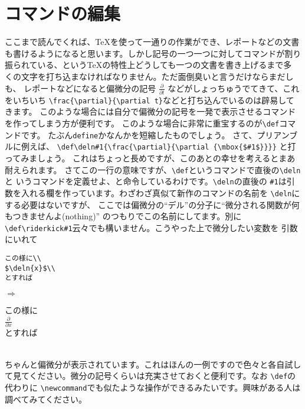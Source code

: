 
\section{コマンドの編集}
ここまで読んでくれば、{\TeX}を使って一通りの作業ができ、レポートなどの文書
も書けるようになると思います。しかし記号の一つ一つに対してコマンドが割り
振られている、という{\TeX}の特性上どうしても一つの文書を書き上げるまで多
くの文字を打ち込まなければなりません。ただ面倒臭いと言うだけならまだしも、
レポートなどになると偏微分の記号
$\displaystyle \frac{\partial}{\partial t}$
などがしょっちゅうでてきて、これをいちいち
\verb+\frac{\partial}{\partial t}+などと打ち込んでいるのは辟易してきます。
このような場合には自分で偏微分の記号を一発で表示させるコマンドを作ってしまう方が便利です。
このような場合に非常に重宝するのが\verb+\def+コマンドです。
たぶん\verb+define+かなんかを短縮したものでしょう。
さて、プリアンブルに例えば、
\verb+\def\deln#1{\frac{\partial}{\partial {\mbox{$#1$}}}}+
と打ってみましょう。
これはちょっと長めですが、このあとの幸せを考えるとまあ耐えられます。
さてこの一行の意味ですが、\verb+\def+というコマンドで直後の\verb+\deln+と
いうコマンドを定義せよ、と命令しているわけです。\verb+\deln+の直後の
\verb+#1+は引数を入れる欄を作っています。わざわざ真似て新作のコマンドの名前を
\verb+\deln+にする必要はないですが、
ここでは偏微分の``デル''の分子に``微分される関数が何もつきませんよ(nothing)''
のつもりでこの名前にしてます。別に
\verb+\def\riderkick#1+云々でも構いません。こうやった上で微分したい変数を
引数にいれて\\
\begin{minipage}[c]{.50\textwidth}
\begin{screen}
\small
\begin{verbatim}
この様に\\
$\deln{x}$\\
とすれば
\end{verbatim}
\end{screen}
\end{minipage}%
$\Rightarrow$
\begin{minipage}{.45\textwidth}
\begin{shadebox}
この様に\\
$\frac{\partial}{\partial x}$\\
とすれば
\end{shadebox}
\end{minipage}\\
\vspace*{5mm}
ちゃんと偏微分が表示されています。これはほんの一例ですので色々と各自試し
て見てください。微分の記号くらいは充実させておくと便利です。なお
\verb+\def+の代わりに
\verb+\newcommand+でも似たような操作ができるみたいです。興味がある人は調べてみてください。

\pagebreak